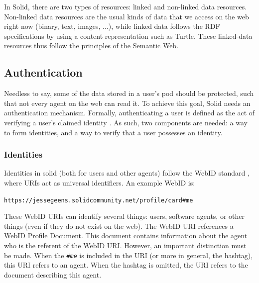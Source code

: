 In Solid, there are two types of resources: linked and non-linked data resources. Non-linked data resources are the usual kinds of data that we access on the web right now (binary, text, images, ...), while linked data follows the 
 \gls{RDF} specifications by using a content representation such as Turtle. These linked-data resources thus follow the principles of the Semantic Web.

\subsection{Authentication}
\label{sec:solid-authentication}
Needless to say, some of the data stored in a user's pod should be protected, such that not every agent on the web can read it. To achieve this goal, Solid needs an authentication mechanism. Formally, authenticating a user is defined as the act of verifying a user's claimed identity \citep{solid}. As such, two components are needed: a way to form identities, and a way to verify that a user possesses an identity.

\newpage
\subsubsection{Identities}
Identities in solid (both for users and other agents) follow the WebID standard \citep{webid}, where URIs act as universal identifiers. An example WebID is:

\begin{center}
   \texttt{https://jessegeens.solidcommunity.net/profile/card\#me}\\
\end{center}

\noindent These WebID URIs can identify several things: users, software agents, or other things (even if they do not exist on the web). The WebID URI references a WebID Profile Document. This document contains information about the agent who is the referent of the WebID URI. However, an important distinction must be made. When the \textit{\texttt{\#me}} is included in the URI (or more in general, the hashtag), this URI refers to an agent. When the hashtag is omitted, the URI refers to the document describing this agent.

{}


